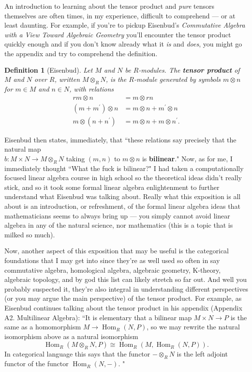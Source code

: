 \documentclass[12pt,reqno]{amsart}
\theoremstyle{plain}
\newtheorem{defi}{Definition}
\DeclareMathOperator{\Hom}{Hom}
\begin{document}
An introduction to learning about the tensor product and \textit{pure} tensors themselves are often times, in my experience, difficult to comprehend — or at least daunting. For example, if you're to pickup Eisenbud's \textit{Commutative Algebra with a View Toward Algebraic Geometry} you'll encounter the tensor product quickly enough and if you don't know already what it \textit{is} and \textit{does}, you might go the appendix and try to comprehend the definition. 
\begin{defi}[Eisenbud] Let $M$ and $N$ be $R$-modules. The \textbf{tensor product} of $M$ and $N$ over $R$, written $M \otimes_R N$, is the $R$-module generated by symbols $m \otimes n$ for $m \in M$ and $n \in N$, with relations 
\begin{align*}
rm \otimes n &= m \otimes rn \\
(m + m^{\prime}) \otimes n &= m \otimes n + m^{\prime} \otimes n  \\
m \otimes (n + n^{\prime}) &= m \otimes n + m \otimes n^{\prime}.
\end{align*}
\end{defi} 

Eisenbud then states, immediately, that ``these relations say precisely that the natural map 
\\ $b \colon M \times N \to M \otimes_R N$ taking $(m, n)$ to $m \otimes n$ is \textbf{bilinear}." Now, as for me, I immediately thought ``What the fuck is bilinear?" I had taken a computationally focused linear algebra course in high school so the theoretical ideas didn't really stick, and so it took some formal linear algebra enlightenment to further understand what Eisenbud was talking about. Really what this exposition is all about is an introduction, or refreshment, of the formal linear algebra ideas that mathematicians seems to always bring up — you simply cannot avoid linear algebra in any of the natural science, nor mathematics (this is a topic that is milked so much).  

Now, another aspect of this exposition that may be useful is the categorical foundations that I may get into since they're as well used so often in say commutative algebra, homological algebra, algebraic geometry, K-theory, algebraic topology, and by god this list can likely stretch so far out. And well you probably suspected it, they're also integral in understanding different perspectives (or you may argue the main perspective) of the tensor product. For example, as Eisenbud continues talking about the tensor product in his appendix (Appendix A2. Multilinear Algebra): ``It is elementary that a bilinear map $M \times N \to P$ is the same as a homomorphism $M \to \Hom_R (N, P)$, so we may rewrite the natural isomorphism above as a natural isomorphism 
$$ \Hom_R (M \otimes_R N, P) \cong \Hom_R (M, \Hom_R (N, P)).$$
In categorical language this says that the functor $- \otimes_R N$ is the left adjoint functor of the functor $\Hom_R (N,  -)$. "
\end{document}
